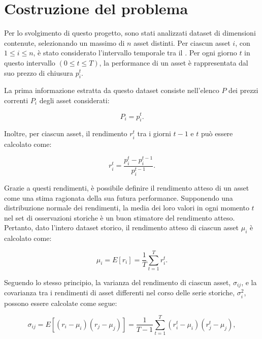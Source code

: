 \section{Costruzione del problema}\label{sec:problema}


Per lo svolgimento di questo progetto, sono stati analizzati dataset di 
dimensioni contenute, selezionando un massimo di $n$ asset distinti. Per ciascun 
asset \(i\), con \(1 \leq i \leq n\), è stato considerato l'intervallo temporale 
tra il . Per ogni giorno \(t\) in questo intervallo 
\((0 \leq t \leq T)\), la performance di un asset è rappresentata dal suo prezzo di 
chiusura \(p_i^t\).


La prima informazione estratta da questo dataset consiste nell'elenco \(P\) dei 
prezzi correnti \(P_i\) degli asset considerati:

\begin{equation}\label{eqn:prezzo}
    P_i = p_i^t. 
\end{equation}

Inoltre, per ciascun asset, il rendimento \(r_i^t\) tra i giorni \(t-1\) e \(t\) 
può essere calcolato come:

\begin{equation}\label{eqn:rendimentoreale}
    r_i^t = \frac{p_i^t - p_i^{t-1}}{p_i^{t-1}}. 
\end{equation}

Grazie a questi rendimenti, è possibile definire il rendimento atteso di un asset 
come una stima ragionata della sua futura performance. Supponendo una distribuzione 
normale dei rendimenti, la media dei loro valori in ogni momento \(t\) nel set di 
osservazioni storiche è un buon stimatore del rendimento atteso. Pertanto, dato 
l'intero dataset storico, il rendimento atteso di ciascun asset \(\mu_i\) è calcolato come:

\begin{equation}\label{eqn:rendimentoatteso}
    \mu_i = E[r_i] = \frac{1}{T} \sum_{t=1}^T r_i^t. 
\end{equation}

Seguendo lo stesso principio, la varianza del rendimento di ciascun asset, $\sigma_{ij}$, e la 
covarianza tra i rendimenti di asset differenti nel corso delle serie storiche, $\sigma_i^2$, 
possono essere calcolate come segue:

\begin{equation}\label{eqn:varianza}
    \sigma_{ij} = E[(r_i - \mu_i)(r_j - \mu_j)] = \frac{1}{T-1} \sum_{t=1}^T (r_i^t - \mu_i)(r_j^t - \mu_j),
\end{equation}

